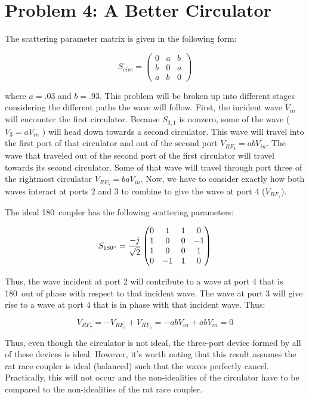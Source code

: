 \section*{Problem 4: A Better Circulator}

The scattering parameter matrix is given in the following form:

\[ 
    S_{circ} = \begin{pmatrix}
        0 & a & b \\ b & 0 & a \\ a & b & 0
    \end{pmatrix} 
\]

where $ a = .03$ and $b = .93$. This problem will be broken up into different
stages considering the different paths the wave will follow. First, the
incident wave $V_{in}$ will encounter the first circulator. Because $S_{3,1}$ is
nonzero, some of the wave ( $V_3 = a V_{in}$ ) will head down towards a second
circulator. This wave will travel into the first port of that circulator and out
of the second port $V_{RF_3} = a b V_{in}$. The wave that traveled out of the
second port of the first circulator will travel towards its second circulator.
Some of that wave will travel through port three of the rightmost circulator
$V_{RF_5} = b a V_{in}$. Now, we have to consider exactly how both waves
interact at ports 2 and 3 to combine to give the wave at port 4 ($V_{RF_7}$).

The ideal 180\degree~coupler has the following scattering parameters:

\[
    S_{180 \degree} = \frac{-j}{\sqrt{2}} \begin{pmatrix}
        0 & 1 & 1 & 0 \\ 1 & 0 & 0 & -1 \\ 1 & 0 & 0 & 1 \\ 0 & -1 & 1 & 0
    \end{pmatrix}
\]

Thus, the wave incident at port 2 will contribute to a wave at port 4 that is
180\degree~out of phase with respect to that incident wave. The wave at port 3
will give rise to a wave at port 4 that is in phase with that incident wave.
Thus:

\[ 
    V_{RF_7} = -V_{RF_3} + V_{RF_5} = -a b V_{in} + a b V_{in} = 0
\]

Thus, even though the circulator is not ideal, the three-port device formed by all of
these devices is ideal. However, it's worth noting that this result assumes the
rat race coupler is ideal (balanced) such that the waves perfectly cancel.
Practically, this will not occur and the non-idealities of the circulator have
to be compared to the non-idealities of the rat race coupler.
